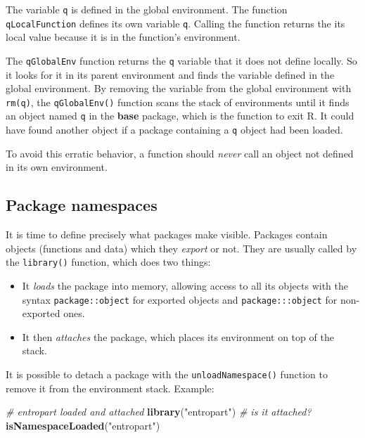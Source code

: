 \documentclass[
  12pt,
  american,
  a4paper,
  extrafontsizes,onecolumn,openright
  ]{memoir}
\newenvironment{Shaded}{\begin{snugshade}}{\end{snugshade}}
\newcommand{\CommentTok}[1]{\textcolor[rgb]{0.56,0.35,0.01}{\textit{#1}}}
\newcommand{\FunctionTok}[1]{\textcolor[rgb]{0.13,0.29,0.53}{\textbf{#1}}}
\newcommand{\NormalTok}[1]{#1}
\newcommand{\StringTok}[1]{\textcolor[rgb]{0.31,0.60,0.02}{#1}}
\providecommand{\tightlist}{%
  \setlength{\itemsep}{0pt}\setlength{\parskip}{0pt}}
\begin{document}
The variable \texttt{q} is defined in the global environment.
The function \texttt{qLocalFunction} defines its own variable \texttt{q}.
Calling the function returns the its local value because it is in the function's environment.

The \texttt{qGlobalEnv} function returns the \texttt{q} variable that it does not define locally.
So it looks for it in its parent environment and finds the variable defined in the global environment.
By removing the variable from the global environment with \texttt{rm(q)}, the \texttt{qGlobalEnv()} function scans the stack of environments until it finds an object named \texttt{q} in the \textbf{base} package, which is the function to exit R.
It could have found another object if a package containing a \texttt{q} object had been loaded.

To avoid this erratic behavior, a function should \emph{never} call an object not defined in its own environment.

\subsection{Package namespaces}\label{package-namespaces}

It is time to define precisely what packages make visible.
Packages contain objects (functions and data) which they \emph{export} or not.
They are usually called by the \texttt{library()} function, which does two things:

\begin{itemize}
\tightlist
\item
  It \emph{loads} the package into memory, allowing access to all its objects with the syntax \texttt{package::object} for exported objects and \texttt{package:::object} for non-exported ones.
\item
  It then \emph{attaches} the package, which places its environment on top of the stack.
\end{itemize}

It is possible to detach a package with the \texttt{unloadNamespace()} function to remove it from the environment stack.
Example:

\scriptsize

\begin{Shaded}
\begin{Highlighting}[]
\CommentTok{\# entropart loaded and attached}
\FunctionTok{library}\NormalTok{(}\StringTok{"entropart"}\NormalTok{)}
\CommentTok{\# is it attached?}
\FunctionTok{isNamespaceLoaded}\NormalTok{(}\StringTok{"entropart"}\NormalTok{)}
\end{Highlighting}
\end{Shaded}
\end{document}
